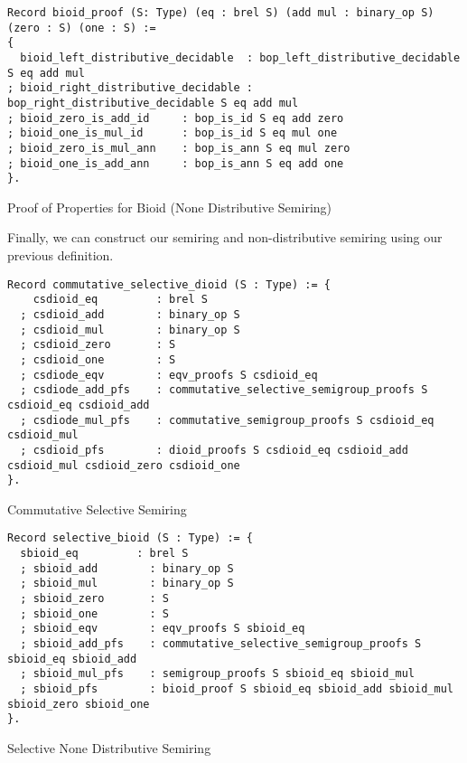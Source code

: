 \begin{listing}[H]
\begin{verbatim}
Record bioid_proof (S: Type) (eq : brel S) (add mul : binary_op S) (zero : S) (one : S) :=
{  
  bioid_left_distributive_decidable  : bop_left_distributive_decidable S eq add mul
; bioid_right_distributive_decidable : bop_right_distributive_decidable S eq add mul
; bioid_zero_is_add_id     : bop_is_id S eq add zero
; bioid_one_is_mul_id      : bop_is_id S eq mul one                                                      
; bioid_zero_is_mul_ann    : bop_is_ann S eq mul zero
; bioid_one_is_add_ann     : bop_is_ann S eq add one
}.
\end{verbatim}
\caption{Proof of Properties for Bioid (None Distributive Semiring)} 
\label{coq:def:bioid_proof}
\end{listing}

Finally, we can construct our semiring and non-distributive semiring using our previous definition.

\begin{listing}[H]
\begin{verbatim}
Record commutative_selective_dioid (S : Type) := {
    csdioid_eq         : brel S  
  ; csdioid_add        : binary_op S
  ; csdioid_mul        : binary_op S                                   
  ; csdioid_zero       : S
  ; csdioid_one        : S
  ; csdiode_eqv        : eqv_proofs S csdioid_eq
  ; csdiode_add_pfs    : commutative_selective_semigroup_proofs S csdioid_eq csdioid_add 
  ; csdiode_mul_pfs    : commutative_semigroup_proofs S csdioid_eq csdioid_mul 
  ; csdioid_pfs        : dioid_proofs S csdioid_eq csdioid_add csdioid_mul csdioid_zero csdioid_one
}.
\end{verbatim}
\caption{Commutative Selective Semiring} 
\label{coq:def:commutative_selective_dioid}
\end{listing}

\begin{listing}[H]
\begin{verbatim}
Record selective_bioid (S : Type) := {
  sbioid_eq         : brel S  
  ; sbioid_add        : binary_op S
  ; sbioid_mul        : binary_op S                                   
  ; sbioid_zero       : S
  ; sbioid_one        : S
  ; sbioid_eqv        : eqv_proofs S sbioid_eq
  ; sbioid_add_pfs    : commutative_selective_semigroup_proofs S sbioid_eq sbioid_add 
  ; sbioid_mul_pfs    : semigroup_proofs S sbioid_eq sbioid_mul 
  ; sbioid_pfs        : bioid_proof S sbioid_eq sbioid_add sbioid_mul sbioid_zero sbioid_one
}.
\end{verbatim}
\caption{Selective None Distributive Semiring} 
\label{coq:def:selective_bioid}
\end{listing}

